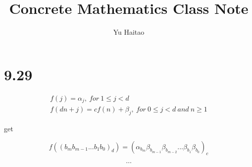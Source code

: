 \documentclass{article}
\title{Concrete Mathematics Class Note}
\author{Yu Haitao}
\begin{document}
\maketitle

\section{9.29}

\begin{gather}
f(j)=\alpha_{j},\ for\ 1 \leqslant j < d \\
f(dn+j)=cf(n)+\beta_j,\ for\ 0 \leqslant j<d\ and\ n \geqslant 1
\end{gather}

get

\begin{equation}
f((b_mb_{m-1}...b_1b_0)_d)=(\alpha_{b_{m}}\beta_{b_{m-1}}\beta_{b_{m-2}}...\beta_{b_1}\beta_{b_0})_c
\end{equation}

\[
\ldots
\]
\end{document}
